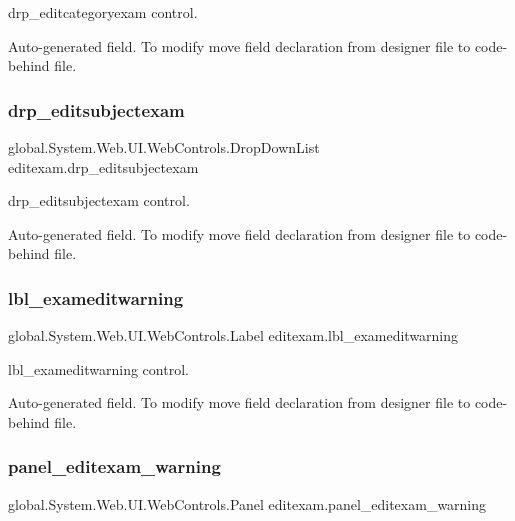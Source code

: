drp\+\_\+editcategoryexam control. 

Auto-\/generated field. To modify move field declaration from designer file to code-\/behind file. \mbox{\label{classeditexam_a1989dcda2e699afabd6fa9117e0eb8f1}} 
\subsubsection{\texorpdfstring{drp\_editsubjectexam}{drp\_editsubjectexam}}
{\footnotesize\ttfamily global.\+System.\+Web.\+U\+I.\+Web\+Controls.\+Drop\+Down\+List editexam.\+drp\+\_\+editsubjectexam\hspace{0.3cm}{\ttfamily [protected]}}



drp\+\_\+editsubjectexam control. 

Auto-\/generated field. To modify move field declaration from designer file to code-\/behind file. \mbox{\label{classeditexam_a2909fb43ac6cb90300b2ebee5f9c20e4}} 
\subsubsection{\texorpdfstring{lbl\_exameditwarning}{lbl\_exameditwarning}}
{\footnotesize\ttfamily global.\+System.\+Web.\+U\+I.\+Web\+Controls.\+Label editexam.\+lbl\+\_\+exameditwarning\hspace{0.3cm}{\ttfamily [protected]}}



lbl\+\_\+exameditwarning control. 

Auto-\/generated field. To modify move field declaration from designer file to code-\/behind file. \mbox{\label{classeditexam_acbbd8953cf1b4270c2074df7c1fce982}} 
\subsubsection{\texorpdfstring{panel\_editexam\_warning}{panel\_editexam\_warning}}
{\footnotesize\ttfamily global.\+System.\+Web.\+U\+I.\+Web\+Controls.\+Panel editexam.\+panel\+\_\+editexam\+\_\+warning\hspace{0.3cm}{\ttfamily [protected]}}



